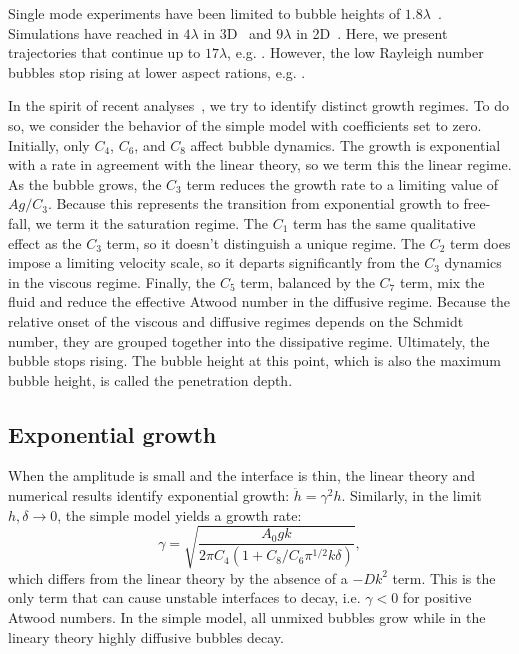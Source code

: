 Single mode experiments have been limited to bubble heights of $1.8\lambda$~\cite{Wilkinson2007}.
Simulations have reached in $4\lambda$ in 3D~\cite{Ramaprabhu2012} and $9\lambda$ in 2D~\cite{Wei2012}.
Here, we present trajectories that continue up to $17\lambda$, e.g. .
However, the low Rayleigh number bubbles stop rising at lower aspect rations, e.g. .

In the spirit of recent analyses~\cite{Ramaprabhu2012, Wei2012}, we try to identify distinct growth regimes.
To do so, we consider the behavior of the simple model with coefficients set to zero.
Initially, only $C_4$, $C_6$, and $C_8$ affect bubble dynamics.
The growth is exponential with a rate in agreement with the linear theory, so we term this the linear regime.
As the bubble grows, the $C_3$ term reduces the growth rate to a limiting value of $A g / C_3$.
Because this represents the transition from exponential growth to free-fall, we term it the saturation regime.
The $C_1$ term has the same qualitative effect as the $C_3$ term, so it doesn't distinguish a unique regime.
The $C_2$ term does impose a limiting velocity scale, so it departs significantly from the $C_3$ dynamics in the viscous regime.
Finally, the $C_5$ term, balanced by the $C_7$ term, mix the fluid and reduce the effective Atwood number in the diffusive regime.
Because the relative onset of the viscous and diffusive regimes depends on the Schmidt number, they are grouped together into the dissipative regime.
Ultimately, the bubble stops rising.
The bubble height at this point, which is also the maximum bubble height, is called the penetration depth.

\subsection{Exponential growth}
When the amplitude is small and the interface is thin, the linear theory and numerical results identify exponential growth: $\ddot{h} = \gamma^2 h$.
Similarly, in the limit $h, \delta \rightarrow 0$, the simple model yields a growth rate:
\begin{equation}
\gamma = \sqrt{\frac{A_0 g k}{2 \pi C_4(1 + C_8 / C_6 \pi^{1/2} k \delta)}},
\end{equation}
which differs from the linear theory by the absence of a $-D k^2$ term.
This is the only term that can cause unstable interfaces to decay, i.e. $\gamma < 0$ for positive Atwood numbers.
In the simple model, all unmixed bubbles grow while in the lineary theory highly diffusive bubbles decay.

